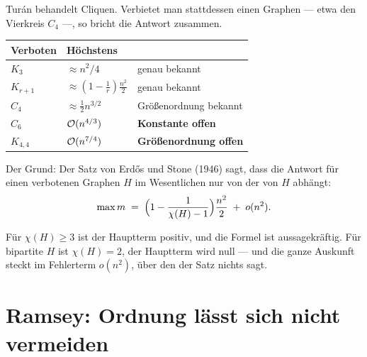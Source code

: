 \begin{warnung}
Turán behandelt Cliquen. Verbietet man stattdessen einen  Graphen --- etwa den Vierkreis $C_4$ ---, so bricht die Antwort zusammen.

\begin{center}
\renewcommand{\arraystretch}{1.48}
\begin{tabular}{@{}P{2.4cm}P{2.6cm}P{3.0cm}@{}}
\toprule
\textbf{Verboten} & \textbf{Höchstens} & \\
\midrule
$K_3$ & $\approx n^2/4$ & \textcolor{gruen}{genau bekannt}\\
$K_{r+1}$ & $\approx (1-\frac1r)\frac{n^2}{2}$ & \textcolor{gruen}{genau bekannt}\\
$C_4$ & $\approx \frac12 n^{3/2}$ & \textcolor{mittel}{Größenordnung bekannt}\\
$C_6$ & $\mathcal{O}(n^{4/3})$ & \textcolor{akzent}{\textbf{Konstante offen}}\\
$K_{4,4}$ & $\mathcal{O}(n^{7/4})$ & \textcolor{akzent}{\textbf{Größenordnung offen}}\\
\bottomrule
\end{tabular}
\end{center}

Der Grund: Der Satz von Erdős und Stone (1946) sagt, dass die Antwort für einen verbotenen Graphen $H$ im Wesentlichen nur von der  von $H$ abhängt:
\[ \max m \;=\; \Bigl(1 - \frac{1}{\chi(H)-1}\Bigr)\frac{n^2}{2} \;+\; o(n^2) . \]

Für $\chi(H) \ge 3$ ist der Hauptterm positiv, und die Formel ist aussagekräftig. Für bipartite $H$ ist $\chi(H) = 2$, der Hauptterm wird null --- und die ganze Auskunft steckt im Fehlerterm $o(n^2)$, über den der Satz nichts sagt.

\begin{center}
\begin{minipage}{0.88\textwidth}
\end{minipage}
\end{center}
\end{warnung}

\section{Ramsey: Ordnung lässt sich nicht vermeiden}

